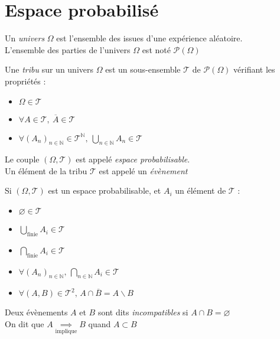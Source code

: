 \documentclass[11pt,a4paper,fleqn,pdftex]{report}
\begin{document}
\section{Espace probabilisé} %
\label{sec:espace_probabilise}
\begin{dfn}[Univers]
     Un \emph{univers} $\Omega$ est l'ensemble des issues d'une expérience aléatoire.\\
     L'ensemble des parties de l'univers $\Omega$ est noté $\mathscr{P}(\Omega{})$
\end{dfn}
\begin{dfn}
     Une \emph{tribu} sur un univers $\Omega$ est un sous-ensemble $\mathscr{T}$ de $\mathscr{P}(\Omega{})$ vérifiant les propriétés :
     \begin{itemize}
         \item $\Omega \in \mathscr{T}$
         \item $\forall A \in \mathscr{T},\: \overline{A} \in \mathscr{T}$
         \item $\forall \left( A_n \right)_{n\in \mathbb{N}} \in \mathscr{T}^\mathbb{N},\: \bigcup_{n\in \mathbb{N}} A_n \in \mathscr{T}$
     \end{itemize}
     Le couple $(\Omega, \mathscr{T})$ est appelé \emph{espace probabilisable}.\\
     Un élément de la tribu $\mathscr{T}$ est appelé un \emph{évènement}
\end{dfn}
\begin{prop}
     Si $(\Omega, \mathscr{T})$ est un espace probabilisable, et $A_i$ un élément de $\mathscr{T}$ :
     \begin{itemize}
         \item $\varnothing \in \mathscr{T}$
         \item $\bigcup_\text{finie} A_i \in \mathscr{T}$
         \item $\bigcap_\text{finie} A_i \in \mathscr{T}$
         \item $\forall (A_n)_{n\in \mathbb{N}},\, \bigcap_{n\in \mathbb{N}} A_i \in \mathscr{T}$
         \item $\forall (A,B) \in \mathscr{T}^2,\, A\cap \overline{B} = A \backslash B$
     \end{itemize}
\end{prop}
\begin{dfn}
     Deux évènements $A$ et $B$ sont dits \emph{incompatibles} si $A \cap B = \varnothing$\\
     On dit que $A \underset{\text{implique}}{\implies} B$ quand $A \subset B$
\end{dfn}
\end{document}
